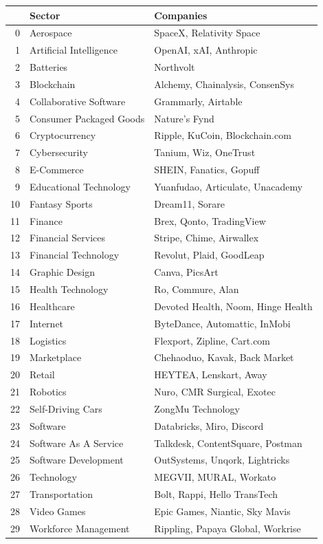 \documentclass[a4paper,12pt]{article}
\begin{document}
\begin{table}[htbp]
\label{}
\centering
\begin{tabular}{rll}
 & Sector & Companies\\
\hline
0 & Aerospace & SpaceX, Relativity Space\\
1 & Artificial Intelligence & OpenAI, xAI, Anthropic\\
2 & Batteries & Northvolt\\
3 & Blockchain & Alchemy, Chainalysis, ConsenSys\\
4 & Collaborative Software & Grammarly, Airtable\\
5 & Consumer Packaged Goods & Nature's Fynd\\
6 & Cryptocurrency & Ripple, KuCoin, Blockchain.com\\
7 & Cybersecurity & Tanium, Wiz, OneTrust\\
8 & E-Commerce & SHEIN, Fanatics, Gopuff\\
9 & Educational Technology & Yuanfudao, Articulate, Unacademy\\
10 & Fantasy Sports & Dream11, Sorare\\
11 & Finance & Brex, Qonto, TradingView\\
12 & Financial Services & Stripe, Chime, Airwallex\\
13 & Financial Technology & Revolut, Plaid, GoodLeap\\
14 & Graphic Design & Canva, PicsArt\\
15 & Health Technology & Ro, Commure, Alan\\
16 & Healthcare & Devoted Health, Noom, Hinge Health\\
17 & Internet & ByteDance, Automattic, InMobi\\
18 & Logistics & Flexport, Zipline, Cart.com\\
19 & Marketplace & Chehaoduo, Kavak, Back Market\\
20 & Retail & HEYTEA, Lenskart, Away\\
21 & Robotics & Nuro, CMR Surgical, Exotec\\
22 & Self-Driving Cars & ZongMu Technology\\
23 & Software & Databricks, Miro, Discord\\
24 & Software As A Service & Talkdesk, ContentSquare, Postman\\
25 & Software Development & OutSystems, Unqork, Lightricks\\
26 & Technology & MEGVII, MURAL, Workato\\
27 & Transportation & Bolt, Rappi, Hello TransTech\\
28 & Video Games & Epic Games, Niantic, Sky Mavis\\
29 & Workforce Management & Rippling, Papaya Global, Workrise\\
\end{tabular}
\end{table}
\newpage
\end{document}
